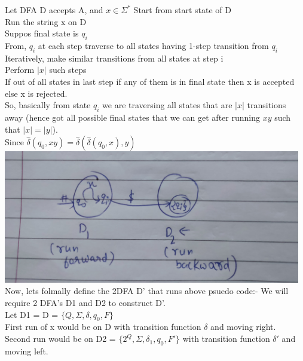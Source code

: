 \documentclass{article}
\begin{document}
Let DFA D accepts A, and $x \in \Sigma^*$
Start from start state of D\\
Run the string x on D\\
Suppos final state is $q_i$\\
From, $q_i$ at each step traverse to all states having 1-step transition from $q_i$\\
Iteratively, make similar transitions from all states at step i\\
Perform $|x|$ such steps\\
If out of all states in last step if any of them is in final state then x is accepted else x is rejected.\\

So, basically from state $q_i$ we are traversing all states that are $|x|$ transitions away (hence got all possible final states that we can get after running $xy$ such that $|x| = |y|$).\\
Since $\hat{\delta}(q_0,xy) = \hat{\delta}(\hat{\delta}(q_0,x),y)$\\

\includegraphics[width=13cm]{3.jpg}\\

Now, lets folmally define the 2DFA D' that runs above psuedo code:- 
We will require 2 DFA's D1 and D2 to construct D'.\\
Let D1 = D = $\{Q,\Sigma,\delta,q_0,F\}$\\
First run of x would be on D with transition function $\delta$ and moving right.\\
Second run would be on D2 = $\{2^Q,\Sigma,\delta_1,q_0,F'\}$ with transition function $\delta'$ and moving left.\\
\end{document}
